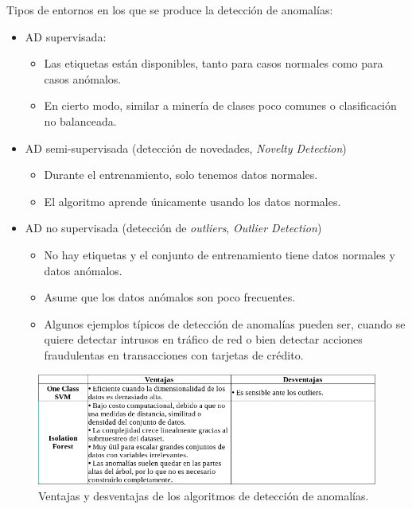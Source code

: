\documentclass[a4paper,12pt]{article}
\begin{document}
Tipos de entornos en los que se produce la detección de anomalías:
\begin{itemize}
	\item AD supervisada:
	\begin{itemize}
		\item Las etiquetas están disponibles, tanto para casos normales como para casos anómalos.
		\item En cierto modo, similar a minería de clases poco comunes o clasificación no balanceada.
	\end{itemize}
	\item AD semi-supervisada (detección de novedades, \textit{Novelty Detection})
	\begin{itemize}
		\item Durante el entrenamiento, solo tenemos datos normales.
		\item El algoritmo aprende únicamente usando los datos normales.
	\end{itemize}
	\item AD no supervisada (detección de \textit{outliers}, \textit{Outlier Detection})
	\begin{itemize}
		\item No hay etiquetas y el conjunto de entrenamiento tiene datos normales y datos anómalos.
		\item Asume que los datos anómalos son poco frecuentes.
		\item Algunos ejemplos típicos de detección de anomalías pueden ser, cuando se quiere detectar intrusos en tráfico de red o bien detectar acciones fraudulentas en transacciones con tarjetas de crédito.
	\end{itemize}
\end{itemize}

\begin{figure}[H]
	\begin{center}				
	\includegraphics[width=1\textwidth]{tesis_11.png}
  	\caption{Ventajas y desventajas de los algoritmos de detección de anomalías.}
  	\label{fig:proconsanomaly.}
  	\end{center}
\end{figure}
\end{document}
